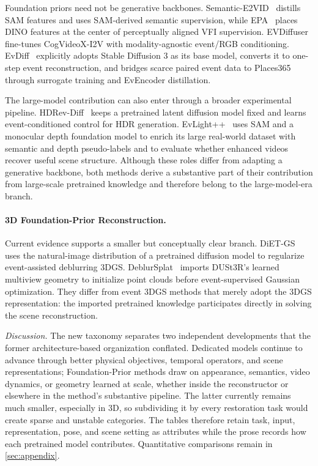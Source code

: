 Foundation priors need not be generative backbones. Semantic-E2VID~\cite{wu2025semantice2vid} distills SAM features and uses SAM-derived semantic supervision, while EPA~\cite{li2025epa} places DINO features at the center of perceptually aligned VFI supervision. EVDiffuser~\cite{chen2025evdiffuser} fine-tunes CogVideoX-I2V with modality-agnostic event/RGB conditioning. EvDiff~\cite{li2025evdiff} explicitly adopts Stable Diffusion 3 as its base model, converts it to one-step event reconstruction, and bridges scarce paired event data to Places365 through surrogate training and EvEncoder distillation.

The large-model contribution can also enter through a broader experimental pipeline. HDRev-Diff~\cite{yang2025hdrevdiff} keeps a pretrained latent diffusion model fixed and learns event-conditioned control for HDR generation. EvLight++~\cite{chen2026evlightpp} uses SAM and a monocular depth foundation model to enrich its large real-world dataset with semantic and depth pseudo-labels and to evaluate whether enhanced videos recover useful scene structure. Although these roles differ from adapting a generative backbone, both methods derive a substantive part of their contribution from large-scale pretrained knowledge and therefore belong to the large-model-era branch.

\paragraph{3D Foundation-Prior Reconstruction.}
Current evidence supports a smaller but conceptually clear branch. DiET-GS~\cite{lee2025dietgs} uses the natural-image distribution of a pretrained diffusion model to regularize event-assisted deblurring 3DGS. DeblurSplat~\cite{zhang2025deblursplat} imports DUSt3R's learned multiview geometry to initialize point clouds before event-supervised Gaussian optimization. They differ from event 3DGS methods that merely adopt the 3DGS representation: the imported pretrained knowledge participates directly in solving the scene reconstruction.

\textit{Discussion.} The new taxonomy separates two independent developments that the former architecture-based organization conflated. Dedicated models continue to advance through better physical objectives, temporal operators, and scene representations; Foundation-Prior methods draw on appearance, semantics, video dynamics, or geometry learned at scale, whether inside the reconstructor or elsewhere in the method's substantive pipeline. The latter currently remains much smaller, especially in 3D, so subdividing it by every restoration task would create sparse and unstable categories. The tables therefore retain task, input, representation, pose, and scene setting as attributes while the prose records how each pretrained model contributes. Quantitative comparisons remain in \cref{sec:appendix}.


